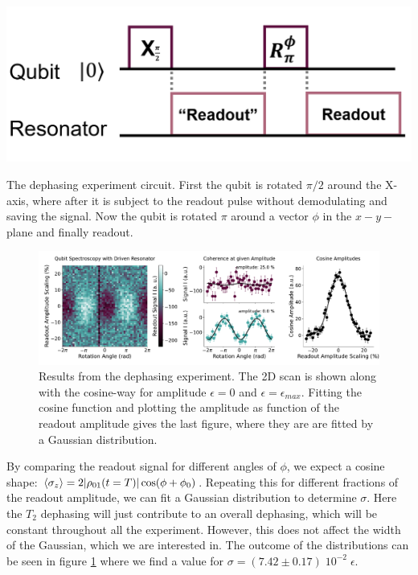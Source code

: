 \begin{marginfigure}[-6 cm]
    \centering
    \includegraphics[]{Figs/circuits/dephasing.png}
    \caption{The dephasing experiment circuit. First the qubit is rotated $\pi/2$ around the X-axis, where after it is subject to the readout pulse without demodulating and saving the signal. Now the qubit is rotated $\pi$ around a vector $\phi$ in the $x-y-$plane and finally readout.}
    \label{fig:efficiency_dephasing_experiment}
\end{marginfigure}
\begin{figure}
    \centering
    \includegraphics{Calibrations/Figures/dephasing_by_measurement.pdf}
    \caption{Results from the dephasing experiment. The 2D scan is shown along with the cosine-way for amplitude $\epsilon = 0$ and $\epsilon = \epsilon_{max}$. Fitting the cosine function and plotting the amplitude as function of the readout amplitude gives the last figure, where they are are fitted by a Gaussian distribution.}
    \label{fig:efficiency_dephasing_result}
\end{figure}

By comparing the readout signal for different angles of $\phi$, we expect a cosine shape: $\expval{\sigma_z} = 2 |\rho_{01}(t= T)| \cos(\phi+\phi_0)$. Repeating this for different fractions of the readout amplitude, we can fit a Gaussian distribution to determine $\sigma$. Here the $T_2$ dephasing will just contribute to an overall dephasing, which will be constant throughout all the experiment. However,  this does not affect the width of the Gaussian, which we are interested in. The outcome of the distributions can be seen in figure \ref{fig:efficiency_dephasing_result} where we find a value for $\sigma = (7.42 \pm 0.17)\; 10^{-2} \; \epsilon$.


